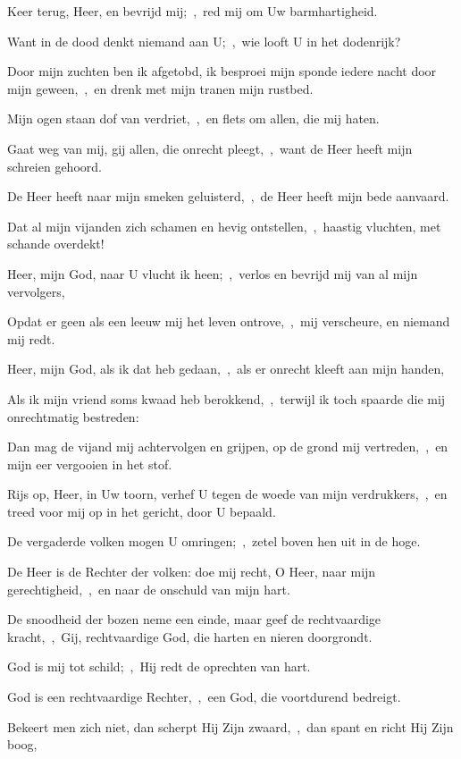 \documentclass[12pt,twoside,a5paper]{article}
\begin{document}
\begin{halfparskip}
  Keer terug, Heer, en bevrijd mij;~\sep\ red mij om Uw barmhartigheid.

  Want in de dood denkt niemand aan U;~\sep\ wie looft U in het dodenrijk?

  Door mijn zuchten ben ik afgetobd, ik besproei mijn sponde iedere nacht door mijn geween,~\sep\ en drenk met mijn tranen mijn rustbed.

  Mijn ogen staan dof van verdriet,~\sep\ en flets om allen, die mij haten.

  Gaat weg van mij, gij allen, die onrecht pleegt,~\sep\ want de Heer heeft mijn schreien gehoord.

  De Heer heeft naar mijn smeken geluisterd,~\sep\ de Heer heeft mijn bede aanvaard.

  Dat al mijn vijanden zich schamen en hevig ontstellen,~\sep\ haastig vluchten, met schande overdekt!

   Heer, mijn God, naar U vlucht ik heen;~\sep\ verlos en bevrijd mij van al mijn vervolgers,

  Opdat er geen als een leeuw mij het leven ontrove,~\sep\ mij verscheure, en niemand mij redt.

  Heer, mijn God, als ik dat heb gedaan,~\sep\ als er onrecht kleeft aan mijn handen,

  Als ik mijn vriend soms kwaad heb berokkend,~\sep\ terwijl ik toch spaarde die mij onrechtmatig bestreden:

  Dan mag de vijand mij achtervolgen en grijpen, op de grond mij vertreden,~\sep\ en mijn eer vergooien in het stof.

  Rijs op, Heer, in Uw toorn, verhef U tegen de woede van mijn verdrukkers,~\sep\ en treed voor mij op in het gericht, door U bepaald.

  De vergaderde volken mogen U omringen;~\sep\ zetel boven hen uit in de hoge.

  De Heer is de Rechter der volken: doe mij recht, O Heer, naar mijn gerechtigheid,~\sep\ en naar de onschuld van mijn hart.

  De snoodheid der bozen neme een einde, maar geef de rechtvaardige kracht,~\sep\ Gij, rechtvaardige God, die harten en nieren doorgrondt.

  God is mij tot schild;~\sep\ Hij redt de oprechten van hart.

  God is een rechtvaardige Rechter,~\sep\ een God, die voortdurend bedreigt.

  Bekeert men zich niet, dan scherpt Hij Zijn zwaard,~\sep\ dan spant en richt Hij Zijn boog,


\end{halfparskip}
\end{document}
